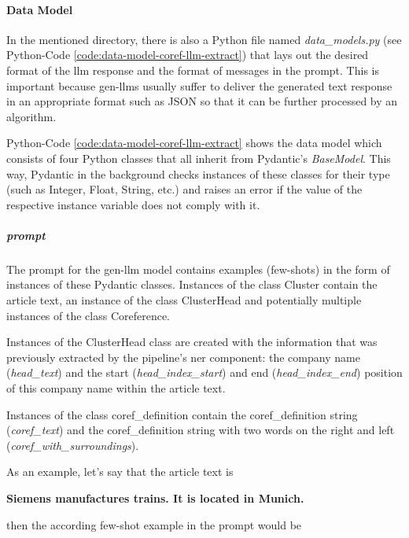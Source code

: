 \paragraph{Data Model}\label{par:coref-data-model}
In the mentioned directory, there is also a Python file named \emph{data\_models.py} (see Python-Code \ref{code:data-model-coref-llm-extract}) that lays out the desired format of the \gls{llm} response and the format of messages in the \gls{prompt}.
This is important because \gls{gen-llm}s usually suffer to deliver the generated text response in an appropriate format such as JSON so that it can be further processed by an algorithm.


Python-Code \ref{code:data-model-coref-llm-extract} shows the data model which consists of four Python classes that all inherit from Pydantic's \emph{BaseModel}.
This way, Pydantic in the background checks instances of these classes for their type (such as Integer, Float, String, etc.) and raises an error if the value of the respective instance variable does not comply with it.

\subparagraph{\gls{prompt}}
The \gls{prompt} for the \gls{gen-llm} model contains examples (few-shots) in the form of instances of these Pydantic classes.
Instances of the class Cluster contain the article text, an instance of the class ClusterHead and potentially multiple instances of the class Coreference.

Instances of the ClusterHead class are created with the information that was previously extracted by the pipeline's \gls{ner} component: the company name (\emph{head\_text}) and the start (\emph{head\_index\_start}) and end (\emph{head\_index\_end}) position of this company name within the article text.

Instances of the class \gls{coref_definition} contain the \gls{coref_definition} string (\emph{coref\_text}) and the \gls{coref_definition} string with two words on the right and left (\emph{coref\_with\_surroundings}).


As an example, let's say that the article text is

\begin{center}
    \textbf{Siemens manufactures trains. It is located in Munich.}
\end{center}
then the according few-shot example in the \gls{prompt} would be

